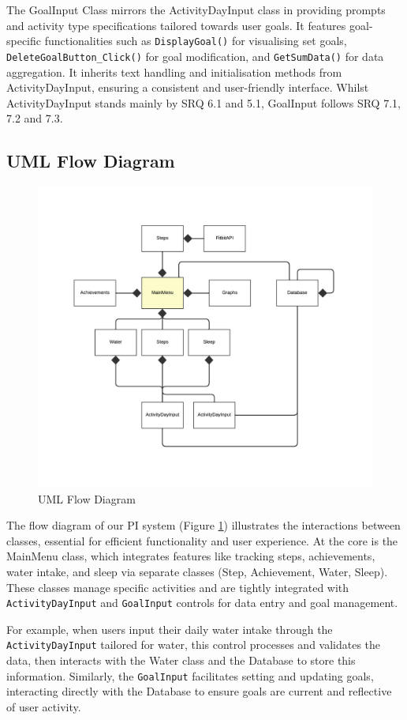 \documentclass[11pt]{article}
\begin{document}
The GoalInput Class mirrors the ActivityDayInput class in providing prompts and
activity type specifications tailored towards user goals. It features
goal-specific functionalities such as \texttt{DisplayGoal()} for visualising
set goals, \texttt{DeleteGoalButton\_Click()} for goal modification, and
\texttt{GetSumData()} for data aggregation. It inherits text handling and
initialisation methods from ActivityDayInput, ensuring a consistent and
user-friendly interface. Whilst ActivityDayInput stands mainly by SRQ 6.1 and
5.1, GoalInput follows SRQ 7.1, 7.2 and 7.3.\par

\vspace{-10pt}
\subsection{UML Flow Diagram}

\begin{figure}[!ht]
  \centering
  \includegraphics[width = 0.7\linewidth]{UML Flow diagram}
  \caption{UML Flow Diagram}
  \label{fig:flow}
\end{figure}

The flow diagram of our PI system (Figure \ref{fig:flow}) illustrates the
interactions between classes, essential for efficient functionality and user
experience. At the core is the MainMenu class, which integrates features like
tracking steps, achievements, water intake, and sleep via separate classes
(Step, Achievement, Water, Sleep). These classes manage specific activities and
are tightly integrated with \texttt{ActivityDayInput} and \texttt{GoalInput} controls for data
entry and goal management.\par

For example, when users input their daily water intake through the
\texttt{ActivityDayInput} tailored for water, this control processes and validates the
data, then interacts with the Water class and the Database to store this
information. Similarly, the \texttt{GoalInput} facilitates setting and updating goals,
interacting directly with the Database to ensure goals are current and
reflective of user activity.\par
\end{document}
